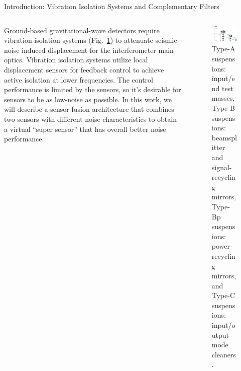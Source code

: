 \documentclass{beamer}
\begin{document}
\begin{frame}[t]
\begin{columns}[t]
\begin{column}{0.32\linewidth}
\begin{block}{Introduction: Vibration Isolation Systems and Complementary Filters}
				\begin{columns}[t, onlytextwidth]
					\begin{column}{0.5\textwidth}	
					Ground-based gravitational-wave detectors require vibration isolation systems (Fig.~\ref{fig:suspension_types}) to attenuate seismic noise induced displacement for the interferometer main optics.
					Vibration isolation systems utilize local displacement sensors for feedback control to achieve active isolation at lower frequencies.
					The control performance is limited by the sensors, so it's desirable for sensors to be as low-noise as possible.
					In this work, we will describe a sensor fusion architecture that combines two sensors with different noise characteristics to obtain a virtual ``super sensor'' that has overall better noise performance.
					\end{column}
					\begin{column}{0.5\textwidth}
						\begin{figure}
							\centering
							\includegraphics[width=0.9\linewidth]{suspension_types_transparent.png}
							\caption{Type-A suspensions: input/end test masses, Type-B suspensions: beamsplitter and signal-recycling mirrors, Type-Bp suspensions: power-recycling mirrors, and Type-C suspensions: input/output mode cleaners \cite{Akutsu:2021auw}.}
							\label{fig:suspension_types}
						\end{figure}
					\end{column}
				\end{columns}
				

\end{block}
\end{column}
\end{columns}
\end{frame}
\end{document}

